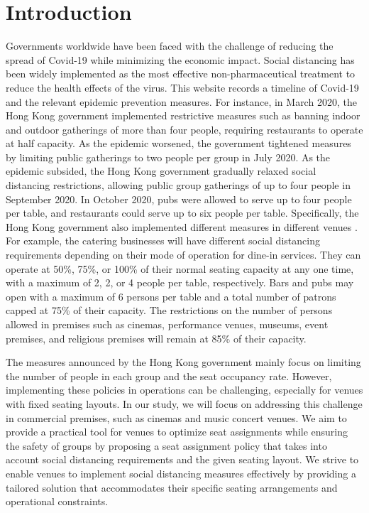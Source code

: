 \section{Introduction}
Governments worldwide have been faced with the challenge of reducing the spread of Covid-19 while minimizing the economic impact. Social distancing has been widely implemented as the most effective non-pharmaceutical treatment to reduce the health effects of the virus. 
This website records a timeline of Covid-19 and the relevant epidemic prevention measures\cite{Covid19Timeline}. For instance, in March 2020, the Hong Kong government implemented restrictive measures such as banning indoor and outdoor gatherings of more than four people, requiring restaurants to operate at half capacity. As the epidemic worsened, the government tightened measures by limiting public gatherings to two people per group in July 2020. As the epidemic subsided, the Hong Kong government gradually relaxed social distancing restrictions, allowing public group gatherings of up to four people in September 2020. In October 2020, pubs were allowed to serve up to four people per table, and restaurants could serve up to six people per table. Specifically, the Hong Kong government also implemented different measures in different venues \cite{Gov202209}. For example, the catering businesses will have different social distancing requirements depending on their mode of operation for dine-in services. They can operate at 50\%, 75\%, or 100\% of their normal seating capacity at any one time, with a maximum of 2, 2, or 4 people per table, respectively. Bars and pubs may open with a maximum of 6 persons per table and a total number of patrons capped at 75\% of their capacity. The restrictions on the number of persons allowed in premises such as cinemas, performance venues, museums, event premises, and religious premises will remain at 85\% of their capacity.

The measures announced by the Hong Kong government mainly focus on limiting the number of people in each group and the seat occupancy rate. However, implementing these policies in operations can be challenging, especially for venues with fixed seating layouts. In our study, we will focus on addressing this challenge in commercial premises, such as cinemas and music concert venues. We aim to provide a practical tool for venues to optimize seat assignments while ensuring the safety of groups by proposing a seat assignment policy that takes into account social distancing requirements and the given seating layout. We strive to enable venues to implement social distancing measures effectively by providing a tailored solution that accommodates their specific seating arrangements and operational constraints.

